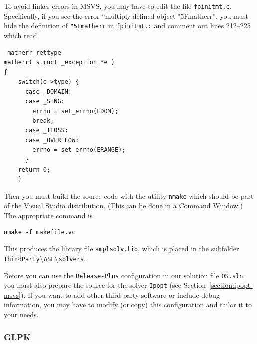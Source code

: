\documentclass[11pt]{article}
\renewcommand{\_}{{\char"5F}}
\renewcommand{\{}{{\char"7B}}
\renewcommand{\}}{{\char"7D}}
\renewcommand{\^}{{\char"0D}}
\renewcommand{\'}{{\char"0D}}
\newif\ifipopt  \ipopttrue      %
\begin{document}
To avoid linker errors in MSVS, you may have to edit the file {\tt fpinitmt.c}.
Specifically, if you see the error ``multiply defined object \_matherr'', you must
hide the definition of {\tt \_matherr} in {\tt fpinitmt.c} and comment out lines 212--225
which read
\begin{verbatim}
 matherr_rettype
matherr( struct _exception *e )
{
	switch(e->type) {
	  case _DOMAIN:
	  case _SING:
		errno = set_errno(EDOM);
		break;
	  case _TLOSS:
	  case _OVERFLOW:
		errno = set_errno(ERANGE);
	  }
	return 0;
	}
\end{verbatim}

Then you must build the source code with the utility {\tt nmake}
which should be part of the Visual Studio distribution. (This can be done in a Command Window.)
The appropriate command is
\begin{verbatim}
nmake -f makefile.vc
\end{verbatim}
This produces the library file {\tt amplsolv.lib}, which is placed in the subfolder
{\tt ThirdParty$\tt\backslash$ASL$\tt\backslash$solvers}.

        
\ifipopt
Before you can use the {\tt Release-Plus} 
configuration in our solution file {\tt OS.sln},
you must also prepare the source for the solver {\tt Ipopt}
(see Section~\ref{section:ipopt-msvs}). If you want to add other third-party software or include debug information,
you may have to modify (or copy) this configuration and tailor it to your needs.
\else
Now you are ready to use MSVS. Both the {\tt Debug}\index{Microsoft Visual Studio!{\tt Debug} configuration} and 
{\tt Release}\index{Microsoft Visual Studio!{\tt Release} configuration} configurations contain two projects, 
{\tt libOSnl2OSiL} and {\tt OSAmplClient}, which use the ASL library and are normally deactivated. 
Activate these projects in the Configuration Manager\index{Microsoft Visual Studio!Configuration Manager} 
(available from the Build menu), then select Build.
\fi
\fi
{}

\subsubsection{GLPK}
\end{document}
